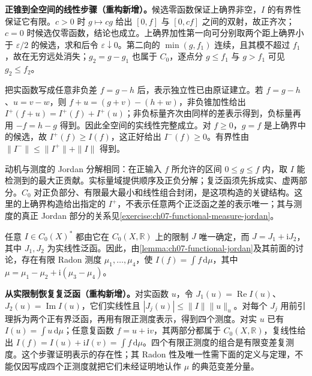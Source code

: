\documentclass[../../main.tex]{subfiles}
\begin{document}
\begin{remark}
\textbf{正锥到全空间的线性步骤（重构新增）。}候选零函数保证上确界非空，$I$ 的有界性保证它有限。$c>0$ 时 $g\mapsto cg$ 给出 $[0,f]$ 与 $[0,cf]$ 之间的双射，故正齐次；$c=0$ 时候选仅零函数，结论也成立。上确界加性第一向可分别取两个距上确界小于 $\varepsilon/2$ 的候选，求和后令 $\varepsilon\downarrow0$。第二向的 $\min(g,f_1)$ 连续，且其模不超过 $f_1$，故在无穷远处消失；$g_2=g-g_1$ 也属于 $C_0$，逐点分 $g\leqslant f_1$ 与 $g>f_1$ 可见 $g_2\leqslant f_2$。

把实函数写成任意非负差 $f=g-h$ 后，表示独立性已由原证建立。若 $f=g-h$、$u=v-w$，则 $f+u=(g+v)-(h+w)$，非负锥加性给出 $I^+(f+u)=I^+(f)+I^+(u)$；非负标量齐次由同样的差表示得到，负标量再用 $-f=h-g$ 得到。因此全空间的实线性完整成立。对 $f\geqslant0$，$g=f$ 是上确界中的候选，故 $I^+(f)\geqslant I(f)$，这正好给出 $I^-(f)\geqslant0$。有界性由 $\|I^-\|\leqslant\|I^+\|+\|I\|$ 得到。

动机与测度的 Jordan 分解相同：在正输入 $f$ 所允许的区间 $0\leqslant g\leqslant f$ 内，取 $I$ 能检测到的最大正贡献。实标量域提供顺序及正负分解；复泛函须先拆成实、虚两部分。$C_0$ 对正负部分、有限最大最小和线性组合封闭，是这项构造的关键结构。这里的上确界构造给出指定的 $I^+$，不表示任意两个正泛函之差的表示唯一；其与测度的真正 Jordan 部分的关系见\cref{exercise:ch07-functional-measure-jordan}。
\end{remark}

任意 $I\in C_0(X)^*$ 都由它在 $C_0(X,\mathbb R)$ 上的限制 $J$ 唯一确定，而 $J=J_1+\mathrm iJ_2$，其中 $J_1,J_2$ 为实线性泛函。因此，由\cref{lemma:ch07-functional-jordan}及其前面的讨论，存在有限 Radon 测度 $\mu_1,\ldots,\mu_4$，使 $I(f)=\int f\,\mathrm d\mu$，其中 $\mu=\mu_1-\mu_2+\mathrm i(\mu_3-\mu_4)$。
\begin{remark}
\textbf{从实限制恢复复泛函（重构新增）。}对实函数 $u$，令 $J_1(u)=\operatorname{Re}I(u)$、$J_2(u)=\operatorname{Im}I(u)$，它们实线性且 $|J_j(u)|\leqslant\|I\|\|u\|_u$。对每个 $J_j$ 用前引理拆为两个正有界泛函，再用有限正测度表示，得到四个测度。对实 $u$ 已有 $I(u)=\int u\,\mathrm d\mu$；任意复函数 $f=u+\mathrm iv$，其两部分都属于 $C_0(X,\mathbb R)$，复线性给出 $I(f)=I(u)+\mathrm iI(v)=\int f\,\mathrm d\mu$。四个有限正测度的组合是有限变差复测度。这个步骤证明表示的存在性；其 Radon 性及唯一性需下面的定义与定理，不能仅因写成四个正测度就把它们未经证明地认作 $\mu$ 的典范变差分量。
\end{remark}
\end{document}
